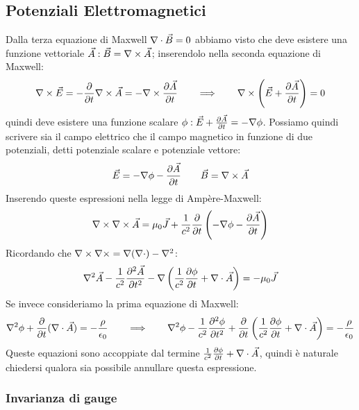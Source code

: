 \documentclass[]{article}
\begin{document}
\subsection{Potenziali Elettromagnetici}

Dalla terza equazione di Maxwell $ \nabla\cdot\vec{B} = 0 $ abbiamo visto che deve esistere una funzione vettoriale $ \vec{A} : \vec{B} = \nabla\times\vec{A} $; inserendolo nella seconda equazione di Maxwell:
\begin{equation}
	\nabla\times\vec{E} = -\frac{\partial}{\partial t} \nabla\times\vec{A} = - \nabla\times \frac{\partial\vec{A}}{\partial t} \qquad\Longrightarrow\qquad \nabla\times\left(\vec{E} + \frac{\partial\vec{A}}{\partial t}\right) = 0
	\label{eq:71}
\end{equation}
quindi deve esistere una funzione scalare $ \phi : \vec{E} + \frac{\partial\vec{A}}{\partial t} = -\nabla\phi $. Possiamo quindi scrivere sia il campo elettrico che il campo magnetico in funzione di due potenziali, detti potenziale scalare e potenziale vettore:
\begin{equation}
	\vec{E} = - \nabla\phi - \frac{\partial\vec{A}}{\partial t} \qquad \vec{B} = \nabla\times\vec{A}
	\label{eq:72}
\end{equation}
Inserendo queste espressioni nella legge di Ampère-Maxwell:
\begin{equation}
	\nabla\times\nabla\times\vec{A} = \mu_0 \vec{J} + \frac{1}{c^2} \frac{\partial}{\partial t} \left(-\nabla\phi - \frac{\partial\vec{A}}{\partial t}\right)
	\label{eq:73}
\end{equation}
Ricordando che $ \nabla\times\nabla\times = \nabla(\nabla\cdot) - \nabla^2 $:
\begin{equation}
	\nabla^2\vec{A} - \frac{1}{c^2} \frac{\partial^2\vec{A}}{\partial t^2} - \nabla\left( \frac{1}{c^2} \frac{\partial\phi}{\partial t} + \nabla\cdot\vec{A} \right) = -\mu_0 \vec{J}
	\label{eq:74}
\end{equation}
Se invece consideriamo la prima equazione di Maxwell:
\begin{equation}
	\nabla^2\phi + \frac{\partial}{\partial t} (\nabla\cdot\vec{A}) = -\frac{\rho}{\epsilon_0} \qquad\Longrightarrow\qquad \nabla^2 \phi - \frac{1}{c^2} \frac{\partial^2 \phi}{\partial t^2} + \frac{\partial}{\partial t} \left( \frac{1}{c^2} \frac{\partial\phi}{\partial t} + \nabla\cdot\vec{A} \right) = -\frac{\rho}{\epsilon_0}
	\label{eq:75}
\end{equation}
Queste equazioni sono accoppiate dal termine $ \frac{1}{c^2} \frac{\partial\phi}{\partial t} + \nabla\cdot\vec{A} $, quindi è naturale chiedersi qualora sia possibile annullare questa espressione. 

\subsubsection{Invarianza di gauge}
\end{document}
